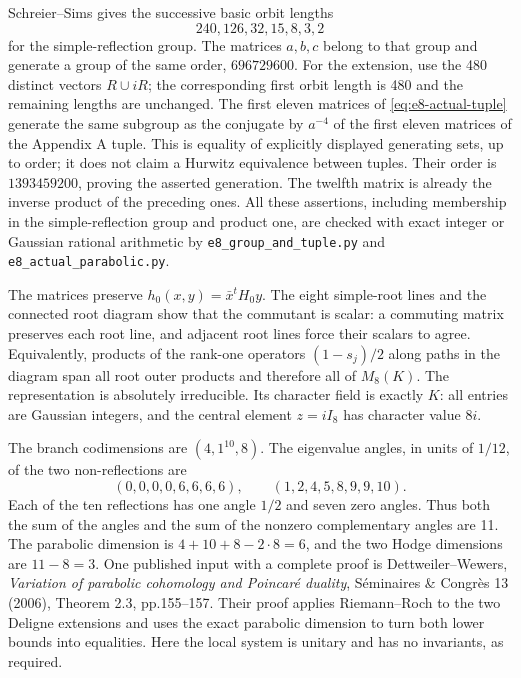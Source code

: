 Schreier--Sims gives the successive basic orbit lengths
\[
 240,126,32,15,8,3,2
\]
for the simple-reflection group. The matrices \(a,b,c\) belong to that
group and generate a group of the same order, \(696729600\).
For the extension, use the 480 distinct vectors \(R\cup iR\);
the corresponding first orbit length is 480 and the remaining lengths
are unchanged. The first eleven matrices of
\eqref{eq:e8-actual-tuple} generate the same subgroup as the conjugate
by \(a^{-4}\) of the first eleven matrices of the Appendix A tuple.
This is equality of explicitly displayed generating sets, up to order;
it does not claim a Hurwitz equivalence between tuples. Their order is
\(1393459200\), proving the asserted generation. The twelfth matrix
is already the inverse product of the preceding ones.
All these assertions, including membership in the simple-reflection
group and product one, are checked with exact integer or Gaussian
rational arithmetic by
\texttt{e8\_group\_and\_tuple.py} and
\texttt{e8\_actual\_parabolic.py}.

The matrices preserve \(h_0(x,y)=\bar x^tH_0y\).
The eight simple-root lines and the connected root diagram show that
the commutant is scalar: a commuting matrix preserves each root line,
and adjacent root lines force their scalars to agree. Equivalently,
products of the rank-one operators \((1-s_j)/2\) along paths in the
diagram span all root outer products and therefore all of \(M_8(K)\).
The representation is absolutely irreducible. Its character field is
exactly \(K\): all entries are Gaussian integers, and the central
element \(z=iI_8\) has character value \(8i\).

The branch codimensions are \((4,1^{10},8)\). The eigenvalue angles,
in units of \(1/12\), of the two non-reflections are
\[
 (0,0,0,0,6,6,6,6),\qquad (1,2,4,5,8,9,9,10).
\]
Each of the ten reflections has one angle \(1/2\) and seven zero
angles. Thus both the sum of the angles and the sum of the nonzero
complementary angles are 11. The parabolic dimension is
\(4+10+8-2\cdot8=6\), and the two Hodge dimensions are
\(11-8=3\). One published input with a complete proof is
Dettweiler--Wewers, \emph{Variation of parabolic cohomology and
Poincar\'e duality}, S\'eminaires \& Congr\`es 13 (2006),
Theorem 2.3, pp.155--157. Their proof applies Riemann--Roch to the
two Deligne extensions and uses the exact parabolic dimension to turn
both lower bounds into equalities. Here the local system is unitary
and has no invariants, as required.

